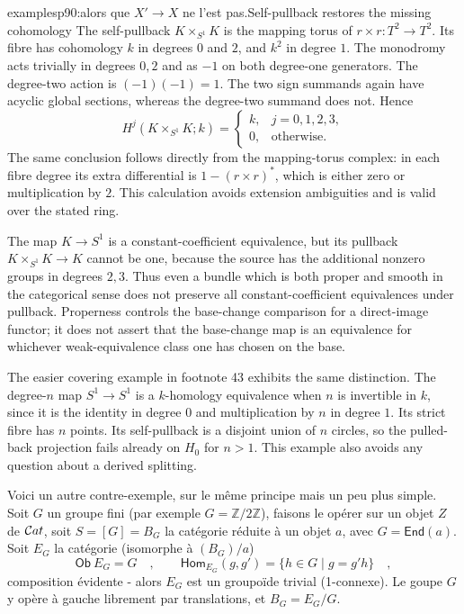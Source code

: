\begin{dcomment}{examples}{p90:alors que $X' \to X$ ne l'est pas.}{Self-pullback restores the missing cohomology}
The self-pullback $K\times_{S^1}K$ is the mapping torus of
$r\times r:T^2\to T^2$. Its fibre has cohomology $k$ in degrees $0$ and $2$, and $k^2$ in degree $1$. The monodromy acts trivially in degrees $0,2$ and as $-1$ on both degree-one generators. The degree-two action is $(-1)(-1)=1$. The two sign summands again have acyclic global sections, whereas the degree-two summand does not. Hence
\[
 H^j(K\times_{S^1}K;k)=
 \begin{cases} k,&j=0,1,2,3,\\0,&\text{otherwise}.\end{cases}
\]
The same conclusion follows directly from the mapping-torus complex: in each fibre degree its extra differential is $1-(r\times r)^*$, which is either zero or multiplication by $2$. This calculation avoids extension ambiguities and is valid over the stated ring.

The map $K\to S^1$ is a constant-coefficient equivalence, but its pullback $K\times_{S^1}K\to K$ cannot be one, because the source has the additional nonzero groups in degrees $2,3$. Thus even a bundle which is both proper and smooth in the categorical sense does not preserve all constant-coefficient equivalences under pullback. Properness controls the base-change comparison for a direct-image functor; it does not assert that the base-change map is an equivalence for whichever weak-equivalence class one has chosen on the base.

The easier covering example in footnote 43 exhibits the same distinction. The degree-$n$ map $S^1\to S^1$ is a $k$-homology equivalence when $n$ is invertible in $k$, since it is the identity in degree $0$ and multiplication by $n$ in degree $1$. Its strict fibre has $n$ points. Its self-pullback is a disjoint union of $n$ circles, so the pulled-back projection fails already on $H_0$ for $n>1$. This example also avoids any question about a derived splitting.
\end{dcomment}


Voici un autre contre-exemple, sur le même principe mais un peu plus simple. Soit $G$ un groupe fini (par exemple $G = \mathbb{Z}/2\mathbb{Z}$), faisons le opérer sur un objet $Z$ de $\mathcal{C}at$, soit $S = [G] = B_G$ la catégorie réduite à un objet $a$, avec $G = \mathsf{End}(a)$. Soit $E_G$ la catégorie (isomorphe à $(B_G)/a$)
\[ \mathsf{Ob}\ E_G = G \quad , \qquad \mathsf{Hom}_{E_G}(g,g') = \{ h \in G \mid g = g'h \} \quad , \]
composition évidente - alors $E_G$ est un groupoïde trivial (1-connexe). Le goupe $G$ y opère à gauche librement par translations, et $B_G = E_G/G$. %


